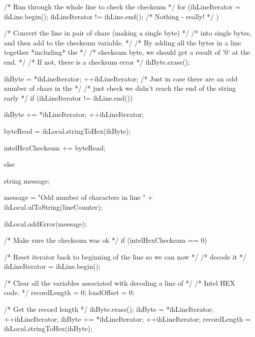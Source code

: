 \begin{DoxyCode}
{{{            /* Run through the whole line to check the checksum               */
            for (ihLineIterator = ihLine.begin(); 
                 ihLineIterator != ihLine.end(); 
                 /* Nothing - really! */ )
            {
                /* Convert the line in pair of chars (making a single byte)   */
                /* into single bytes, and then add to the checksum variable.  */
                /* By adding all the bytes in a line together *including* the */
                /* checksum byte, we should get a result of '0' at the end.   */
                /* If not, there is a checksum error                          */
                ihByte.erase();
                
                ihByte = *ihLineIterator;
                ++ihLineIterator;
                /* Just in case there are an odd number of chars in the       */
                /* just check we didn't reach the end of the string early     */
                if (ihLineIterator != ihLine.end())
                {
                    ihByte += *ihLineIterator;
                    ++ihLineIterator;
                
                    byteRead = ihLocal.stringToHex(ihByte);
                           
                    intelHexChecksum += byteRead;
                }
                else
                {
                    string message;
                            
                    message = "Odd number of characters in line " +
                                                ihLocal.ulToString(lineCounter);
                            
                    ihLocal.addError(message);
                }
            }
        
            /* Make sure the checksum was ok                                  */
            if (intelHexChecksum == 0)
            {
                /* Reset iterator back to beginning of the line so we can now */
                /* decode it                                                  */
                ihLineIterator = ihLine.begin();
                
                /* Clear all the variables associated with decoding a line of */
                /* Intel HEX code.                                            */
                recordLength = 0;
                loadOffset = 0;
                
                /* Get the record length                                      */
                ihByte.erase();
                ihByte = *ihLineIterator;
                ++ihLineIterator;
                ihByte += *ihLineIterator;
                ++ihLineIterator;
                recordLength = ihLocal.stringToHex(ihByte);
                
}}}}
\end{DoxyCode}
